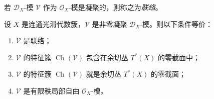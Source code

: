 若 $\mathcal{D}_X$-模 $\mathcal{V}$ 作为 $\mathcal{O}_X$-模是凝聚的，则称之为\emph{联络}。

\begin{theorem}\label{thm:5.2.1}
设 $X$ 是连通光滑代数簇，$\mathcal{V}$ 是非零凝聚 $\mathcal{D}_X$-模。则以下条件等价：
\begin{enumerate}[label=(\roman*)]
  \item $\mathcal{V}$ 是联络；
  \item $\mathcal{V}$ 的特征簇 $\operatorname{Ch}(\mathcal{V})$ 包含在余切丛 $T^*(X)$ 的零截面中；
  \item $\mathcal{V}$ 的特征簇 $\operatorname{Ch}(\mathcal{V})$ 就是余切丛 $T^*(X)$ 的零截面；
  \item $\mathcal{V}$ 是有限秩局部自由 $\mathcal{O}_X$-模。
\end{enumerate}
\end{theorem}

